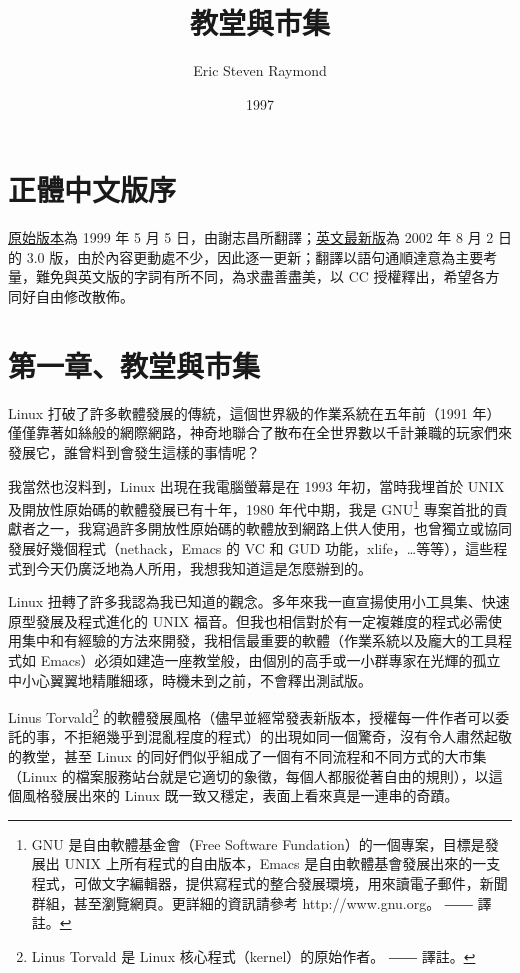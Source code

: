 \documentclass[12pt, a5paper]{book}
\title{教堂與市集}
\author{Eric Steven Raymond}
\date{1997}
\begin{document}
\maketitle

\begingroup
\hypersetup{linkcolor=black}
\tableofcontents
\endgroup

\section{正體中文版序}\label{ux6b63ux9ad4ux4e2dux6587ux7248ux5e8f}

\href{http://www.linux.org.tw/CLDP/OLD/doc/Cathedral-Bazaar.html}{原始版本}為
1999 年 5 月 5
日，由謝志昌所翻譯；\href{http://www.catb.org/esr/writings/homesteading/cathedral-bazaar/}{英文最新版}為
2002 年 8 月 2 日的 3.0
版，由於內容更動處不少，因此逐一更新；翻譯以語句通順達意為主要考量，難免與英文版的字詞有所不同，為求盡善盡美，以
CC 授權釋出，希望各方同好自由修改散佈。

\newpage
\section{第一章、教堂與市集}\label{ux7b2cux4e00ux7ae0ux6559ux5802ux8207ux5e02ux96c6}

Linux 打破了許多軟體發展的傳統，這個世界級的作業系統在五年前（1991
年）僅僅靠著如絲般的網際網路，神奇地聯合了散布在全世界數以千計兼職的玩家們來發展它，誰曾料到會發生這樣的事情呢？

我當然也沒料到，Linux 出現在我電腦螢幕是在 1993 年初，當時我埋首於 UNIX
及開放性原始碼的軟體發展已有十年，1980 年代中期，我是 GNU\footnote{GNU
  是自由軟體基金會（Free Software Fundation）的一個專案，目標是發展出
  UNIX 上所有程式的自由版本，Emacs
  是自由軟體基會發展出來的一支程式，可做文字編輯器，提供寫程式的整合發展環境，用來讀電子郵件，新聞群組，甚至瀏覽網頁。更詳細的資訊請參考
  http://www.gnu.org。 ―― 譯註。}
專案首批的貢獻者之一，我寫過許多開放性原始碼的軟體放到網路上供人使用，也曾獨立或協同發展好幾個程式（nethack，Emacs
的 VC 和 GUD
功能，xlife，\ldots{}等等），這些程式到今天仍廣泛地為人所用，我想我知道這是怎麼辦到的。

Linux
扭轉了許多我認為我已知道的觀念。多年來我一直宣揚使用小工具集、快速原型發展及程式進化的
UNIX
福音。但我也相信對於有一定複雜度的程式必需使用集中和有經驗的方法來開發，我相信最重要的軟體（作業系統以及龐大的工具程式如
Emacs）必須如建造一座教堂般，由個別的高手或一小群專家在光輝的孤立中小心翼翼地精雕細琢，時機未到之前，不會釋出測試版。

Linus Torvald\footnote{Linus Torvald 是 Linux
  核心程式（kernel）的原始作者。 ―― 譯註。}
的軟體發展風格（儘早並經常發表新版本，授權每一件作者可以委託的事，不拒絕幾乎到混亂程度的程式）的出現如同一個驚奇，沒有令人肅然起敬的教堂，甚至
Linux 的同好們似乎組成了一個有不同流程和不同方式的大市集（Linux
的檔案服務站台就是它適切的象徵，每個人都服從著自由的規則），以這個風格發展出來的
Linux 既一致又穩定，表面上看來真是一連串的奇蹟。
\end{document}
